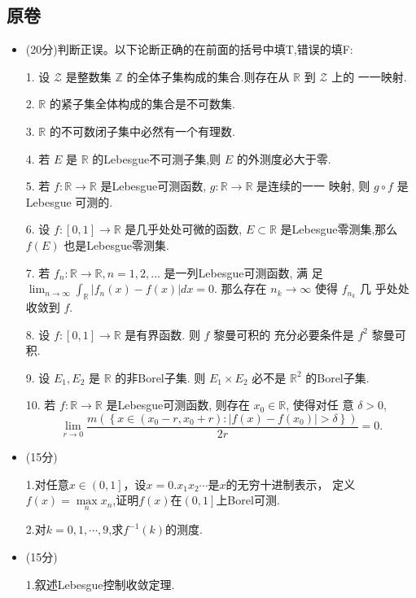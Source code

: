 \subsection{原卷}
\begin{itemize}
\item[一、](20分)判断正误。以下论断正确的在前面的括号中填T,错误的填F:

1. 设 $\mathcal{Z}$ 是整数集 $\mathbb{Z}$ 的全体子集构成的集合.则存在从 $\mathbb{R}$ 到 $\mathcal{Z}$ 上的 一一映射.

2. $\mathbb{R}$ 的紧子集全体构成的集合是不可数集.

3. $\mathbb{R}$ 的不可数闭子集中必然有一个有理数.

4. 若 $E$ 是 $\mathbb{R}$ 的Lebesgue不可测子集,则 $E$ 的外测度必大于零.

5. 若 $f: \mathbb{R} \rightarrow \mathbb{R}$ 是Lebesgue可测函数, $g: \mathbb{R} \rightarrow \mathbb{R}$ 是连续的一一 映射, 则 $g \circ f$ 是Lebesgue 可测的.

6. 设 $f:[0,1] \rightarrow \mathbb{R}$ 是几乎处处可微的函数, $E \subset \mathbb{R}$ 是Lebesgue零测集,那么 $f(E)$ 也是Lebesgue零测集.

7. 若 $f_n: \mathbb{R} \rightarrow \mathbb{R}, n=1,2, \ldots$ 是一列Lebesgue可测函数, 满 足 $\lim _{n \rightarrow \infty} \int_{\mathbb{R}}\left|f_n(x)-f(x)\right| d x=0$. 那么存在 $n_k \rightarrow \infty$ 使得 $f_{n_k}$ 几 乎处处收敛到 $f$.

8. 设 $f:[0,1] \rightarrow \mathbb{R}$ 是有界函数. 则 $f$ 黎曼可积的 充分必要条件是 $f^{2}$ 黎曼可积.

9. 设 $E_1, E_2$ 是 $\mathbb{R}$ 的非Borel子集. 则 $E_1 \times E_2$ 必不是 $\mathbb{R}^2$ 的Borel子集.

10. 若 $f: \mathbb{R} \rightarrow \mathbb{R}$ 是Lebesgue可测函数, 则存在 $x_0 \in \mathbb{R}$, 使得对任 意 $\delta>0$,
$$
\lim_{r \rightarrow 0} \frac{m(\left\{x \in\left(x_0-r, x_0+r\right):\left|f(x)-f(x_0)\right|>\delta\right\})}{2r}=0.
$$

\item[二、](15分)

1.对任意$ x\in\left(0,1\right] $，设$ x=0.x_{1}x_{2}\cdots $是$ x $的无穷十进制表示，
定义$ f(x)=\max\limits_n x_{n} $,证明$ f(x) $在$ \left(0,1\right] $上Borel可测.

2.对$ k=0,1,\cdots,9 $,求$ f^{-1}(k) $的测度.

\item[三、](15分)

1.叙述Lebesgue控制收敛定理.


\end{itemize}
